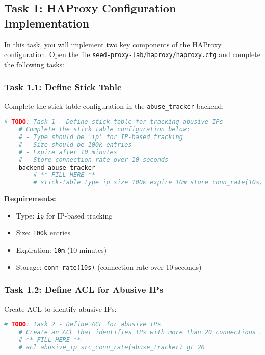 \documentclass[12pt]{article}
\begin{document}
    \subsection{Task 1: HAProxy Configuration Implementation}

    In this task, you will implement two key components of the HAProxy configuration. Open the file \texttt{seed-proxy-lab/haproxy/haproxy.cfg} and complete the following tasks:

    \subsubsection{Task 1.1: Define Stick Table}
    Complete the stick table configuration in the \texttt{abuse\_tracker} backend:

    \begin{lstlisting}[language=bash, caption=HAProxy Configuration - Task 1.1]
    # TODO: Task 1 - Define stick table for tracking abusive IPs
    # Complete the stick table configuration below:
    # - Type should be 'ip' for IP-based tracking
    # - Size should be 100k entries
    # - Expire after 10 minutes
    # - Store connection rate over 10 seconds
    backend abuse_tracker
        # ** FILL HERE **
        # stick-table type ip size 100k expire 10m store conn_rate(10s)
    \end{lstlisting}

    \textbf{Requirements:}
    \begin{itemize}
        \item Type: \texttt{ip} for IP-based tracking
        \item Size: \texttt{100k} entries
        \item Expiration: \texttt{10m} (10 minutes)
        \item Storage: \texttt{conn\_rate(10s)} (connection rate over 10 seconds)
    \end{itemize}

    \subsubsection{Task 1.2: Define ACL for Abusive IPs}
    Create ACL to identify abusive IPs:

    \begin{lstlisting}[language=bash, caption=HAProxy Configuration - Task 1.2]
    # TODO: Task 2 - Define ACL for abusive IPs
    # Create an ACL that identifies IPs with more than 20 connections in 10 seconds
    # ** FILL HERE **
    # acl abusive_ip src_conn_rate(abuse_tracker) gt 20
    \end{lstlisting}
\end{document}
